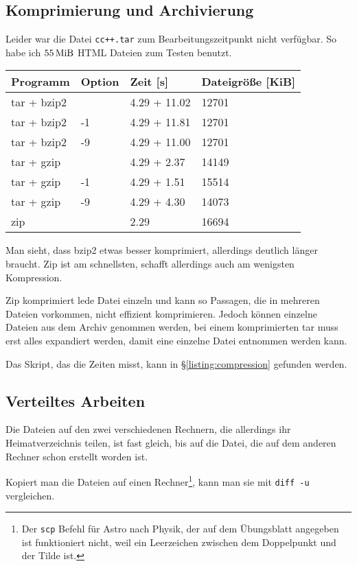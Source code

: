 \documentclass[12pt]{article}
\begin{document}



\subsection{Komprimierung und Archivierung}

Leider war die Datei \texttt{cc++.tar} zum Bearbeitungszeitpunkt nicht verfügbar. So habe ich $\unit[55]{MiB}$ HTML Dateien zum Testen benutzt.

\begin{tabular}{llll}
Programm & Option & Zeit [s] & Dateigröße [KiB] \\
\hline
tar + bzip2 &  & 4.29 + 11.02 & 12701 \\
tar + bzip2 & -1 & 4.29 + 11.81 & 12701 \\
tar + bzip2 & -9 & 4.29 + 11.00 & 12701 \\
tar + gzip &  & 4.29 + 2.37 & 14149 \\
tar + gzip & -1 & 4.29 + 1.51 & 15514 \\
tar + gzip & -9 & 4.29 + 4.30 & 14073 \\
zip &  & 2.29 & 16694\\
\end{tabular}

Man sieht, dass bzip2 etwas besser komprimiert, allerdings deutlich länger braucht. Zip ist am schnellsten, schafft allerdings auch am wenigsten Kompression.

Zip komprimiert lede Datei einzeln und kann so Passagen, die in mehreren Dateien vorkommen, nicht effizient komprimieren. Jedoch können einzelne Dateien aus dem Archiv genommen werden, bei einem komprimierten tar muss erst alles expandiert werden, damit eine einzelne Datei entnommen werden kann.

Das Skript, das die Zeiten misst, kann in §\ref{listing:compression} gefunden werden.


\subsection{Verteiltes Arbeiten}

Die Dateien auf den zwei verschiedenen Rechnern, die allerdings ihr Heimatverzeichnis teilen, ist fast gleich, bis auf die Datei, die auf dem anderen Rechner schon erstellt worden ist.

Kopiert man die Dateien auf einen Rechner\footnote{Der \texttt{scp} Befehl für Astro nach Physik, der auf dem Übungsblatt angegeben ist funktioniert nicht, weil ein Leerzeichen zwischen dem Doppelpunkt und der Tilde ist.}, kann man sie mit \texttt{diff -u} vergleichen.
\end{document}
